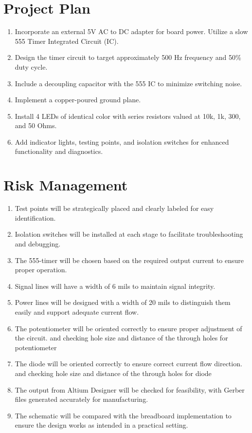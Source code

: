 \documentclass[a4paper,11pt]{article}%
\begin{document}
\section{Project Plan}
\begin{enumerate}
	\item Incorporate an external 5V AC to DC adapter for board power.
	Utilize a slow 555 Timer Integrated Circuit (IC).
	\item Design the timer circuit to target approximately 500 Hz frequency and 50\% duty cycle.
	\item Include a decoupling capacitor with the 555 IC to minimize switching noise.
	\item Implement a copper-poured ground plane.
	\item Install 4 LEDs of identical color with series resistors valued at 10k, 1k, 300, and 50 Ohms.
	\item Add indicator lights, testing points, and isolation switches for enhanced functionality and diagnostics.
\end{enumerate}



\section{Risk Management}
\begin{enumerate}
	\item Test points will be strategically placed and clearly labeled for easy identification.
	\item Isolation switches will be installed at each stage to facilitate troubleshooting and debugging.
	\item The 555-timer will be chosen based on the required output current to ensure proper operation.
	\item Signal lines will have a width of 6 mils to maintain signal integrity.
	\item Power lines will be designed with a width of 20 mils to distinguish them easily and support adequate current flow.
	\item The potentiometer will be oriented correctly to ensure proper adjustment of the circuit. and checking hole size and distance of the through holes for potentiometer
	\item The diode will be oriented correctly to ensure correct current flow direction. and checking hole size and distance of the through holes for diode
	\item The output from Altium Designer will be checked for feasibility, with Gerber files generated accurately for manufacturing.
	\item The schematic will be compared with the breadboard implementation to ensure the design works as intended in a practical setting.
	
\end{enumerate}
\end{document}
